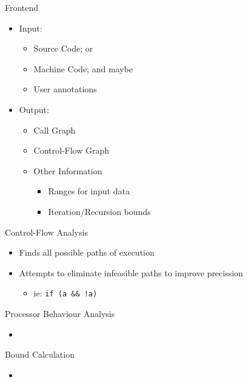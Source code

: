 \documentclass{beamer}
\begin{document}
\begin{frame}{Frontend}
  \begin{itemize}
    \item Input:
      \begin{itemize}
        \item Source Code; or
        \item Machine Code; and maybe
        \item User annotations
      \end{itemize}
    \item Output:
      \begin{itemize}
        \item Call Graph
        \item Control-Flow Graph
        \item Other Information
          \begin{itemize}
            \item Ranges for input data
            \item Iteration/Recursion bounds
          \end{itemize}
      \end{itemize}
  \end{itemize}
\end{frame}

\begin{frame}{Control-Flow Analysis}
  \begin{itemize}
    \item Finds all possible paths of execution
    \item Attempts to eliminate infeasible paths to improve precission
      \begin{itemize}
        \item ie: \texttt{if (a \&\& !a)}
      \end{itemize}
  \end{itemize}
\end{frame}

\begin{frame}{Processor Behaviour Analysis}
  \begin{itemize}
    \item
  \end{itemize}
\end{frame}

\begin{frame}{Bound Calculation}
  \begin{itemize}
    \item
  \end{itemize}
\end{frame}
\end{document}
